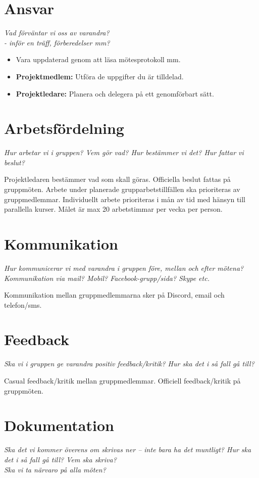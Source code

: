 \section*{Ansvar}
\textit{Vad förväntar vi oss av varandra? \\
\indent - inför en träff, förberedelser mm?}

\begin{itemize}[noitemsep]
    \item Vara uppdaterad genom att läsa mötesprotokoll mm.
    \item \textbf{Projektmedlem:} Utföra de uppgifter du är tilldelad.
    \item \textbf{Projektledare: } Planera och delegera på ett genomförbart sätt.
\end{itemize}

\section*{Arbetsfördelning}
\textit{Hur arbetar vi i gruppen? Vem gör vad? Hur bestämmer vi det? Hur fattar vi beslut?}

Projektledaren bestämmer vad som skall göras. Officiella beslut fattas på gruppmöten. Arbete under planerade grupparbetstillfällen ska prioriteras av gruppmedlemmar. Individuellt arbete prioriteras i mån av tid med hänsyn till parallella kurser. Målet är max 20 arbetstimmar per vecka per person.

\section*{Kommunikation}
\textit{Hur kommunicerar vi med varandra i gruppen före, mellan och efter mötena? Kommunikation via mail? Mobil? Facebook-grupp/sida? Skype etc.}

Kommunikation mellan gruppmedlemmarna sker på Discord, email och telefon/sms.

\section*{Feedback}
\textit{Ska vi i gruppen ge varandra positiv feedback/kritik? Hur ska det i så fall gå till?}

Casual feedback/kritik mellan gruppmedlemmar. Officiell feedback/kritik på gruppmöten.

\section*{Dokumentation}
\textit{Ska det vi kommer överens om skrivas ner – inte bara ha det muntligt? Hur ska det i så fall gå till? Vem ska skriva? \\
Ska vi ta närvaro på alla möten?}

